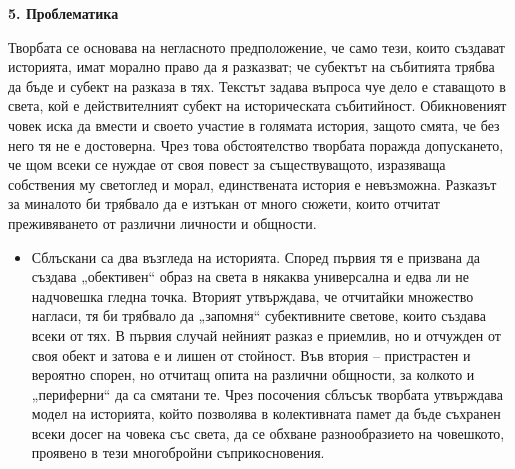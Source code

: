 \documentclass[12pt,a4paper]{article}
\begin{document}
\vspace{0.1cm}
 
\textbf{5. Проблематика}
\vspace{0.1cm}

\indent Творбата се основава на негласното предположение, че само тези, които създават историята, имат морално право да я разказват; че субектът на събитията трябва да бъде и субект на разказа в тях. Текстът задава въпроса чуе дело е ставащото в света, кой е действителният субект на историческата събитийност. Обикновеният човек иска да вмести и своето участие в голямата история, защото смята, че без него тя не е достоверна. Чрез това обстоятелство творбата поражда допускането, че щом всеки се нуждае от своя повест за съществуващото, изразяваща собствения му светоглед и морал, единствената история е невъзможна. Разказът за миналото би трябвало да е изтъкан от много сюжети, които отчитат преживяването от различни личности и общности.

\begin{itemize}[leftmargin=*]
\vspace{-0.30cm}
\item Сблъскани са два възгледа на историята. Според първия тя е призвана да създава „обективен“ образ на света в някаква универсална и едва ли не надчовешка гледна точка. Вторият утвърждава, че отчитайки множество нагласи, тя би трябвало да „запомня“ субективните светове, които създава всеки от тях. В първия случай нейният разказ е приемлив, но и отчужден от своя обект и затова е и лишен от стойност. Във втория – пристрастен и вероятно спорен, но отчитащ опита на различни общности, за колкото и „периферни“ да са смятани те. Чрез посочения сблъсък творбата утвърждава модел на историята, който позволява в колективната памет да бъде съхранен всеки досег на човека със света, да се обхване разнообразието на човешкото, проявено в тези многобройни съприкосновения.
\end{itemize}
\end{document}
